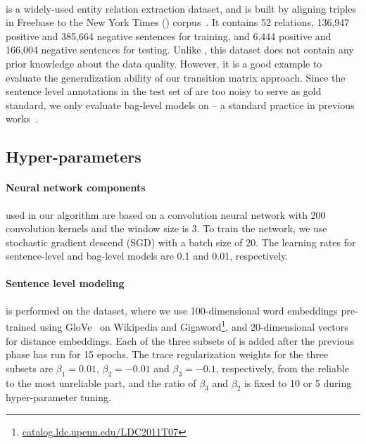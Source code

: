 \paragraph{\EntityRE} is a widely-used entity
relation extraction dataset, and is built %
by aligning triples
in Freebase to the New York Times (\NYT) corpus~\cite{riedel2010modeling}. It contains 52 relations, 136,947 positive and 385,664 negative sentences for training, and 6,444 positive and 166,004 negative sentences  for testing.
Unlike \TimeRE, this dataset does not contain any prior knowledge about the data quality.
However, it is a good example to evaluate the generalization ability of our transition matrix approach.
Since the sentence level annotations in the test set of \EntityRE are too noisy to serve as gold standard,  we only evaluate bag-level models on \EntityRE -- a standard practice in previous works~\cite{surdeanu2012multi,zeng2015distant,lin2016neural}.



\subsection{Hyper-parameters}

\paragraph{Neural network components} used in our algorithm are based on a convolution neural network with 200 convolution kernels and the window size is 3. To train the network, we use stochastic gradient descend (SGD) with a batch size of 20.  The learning rates for sentence-level  and bag-level models are 0.1 and 0.01, respectively.

\paragraph{Sentence level modeling}
 is performed on the \TimeRE dataset, where we use 100-dimensional word embeddings pre-trained using GloVe~\cite{pennington2014glove} on Wikipedia and Gigaword\footnote{\url{catalog.ldc.upenn.edu/LDC2011T07}}, and 20-dimensional vectors for distance embeddings. Each of the three subsets of \TimeRE is added after the previous phase has run for 15 epochs. The trace regularization weights for the three subsets are $\beta_1=0.01$, $\beta_2=-0.01$ and $\beta_3=-0.1$, respectively, from the reliable to the most unreliable part, and the ratio of $\beta_3$ and $\beta_2$ is fixed to 10 or 5 during hyper-parameter tuning.

